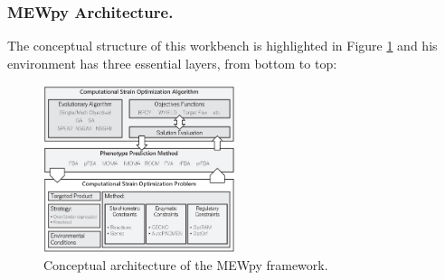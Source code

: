 \documentclass[runningheads]{llncs}
\begin{document}
\subsubsection{MEWpy Architecture.}
The conceptual structure of this workbench is highlighted in Figure \ref{fig:mewpyarch} and his environment has three essential layers, from bottom to top:

\begin{figure}[H]
    \centering
    \includegraphics[width=0.50\textwidth]{imagens/mewpy_architecture.png}
    \caption{Conceptual architecture of the MEWpy framework. \cite{pereira2021mewpy}}
    \label{fig:mewpyarch}
\end{figure}
\end{document}
